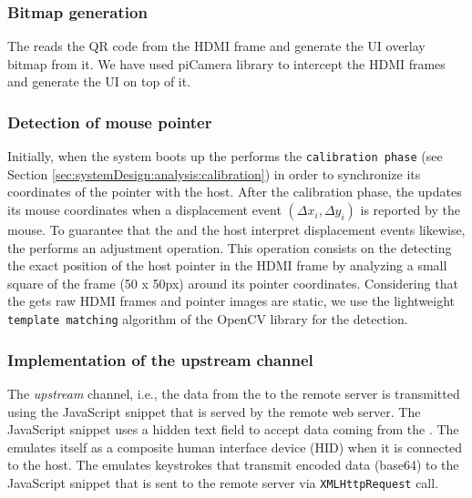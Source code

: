 \subsubsection{\bfseries Bitmap generation}

The \device reads the QR code from the HDMI frame and generate the UI overlay bitmap from it. We have used piCamera library to intercept the HDMI frames and generate the UI on top of it. 

\subsubsection{\bfseries Detection of mouse pointer}
Initially, when the system boots up the \device performs the \texttt{calibration phase} (see Section \ref{sec:systemDesign:analysis:calibration}) in order to synchronize its coordinates of the pointer with the host. After the calibration phase, the \device updates its mouse coordinates when a displacement event $(\Delta x_i, \Delta y_i)$ is reported by the mouse. To guarantee that the \device and the host interpret displacement events likewise, the \device performs an adjustment operation. This operation consists on the \device detecting the exact position of the host pointer in the HDMI frame by analyzing a small square of the frame (50 x 50px) around its pointer coordinates. Considering that the \device gets raw HDMI frames and pointer images are static, we use the lightweight \texttt{template matching} algorithm of the OpenCV library for the detection.

\subsubsection{\bfseries Implementation of the upstream channel}
\label{sec:prototype:impl:upstream}

 The \emph{upstream} channel, i.e., the data from the \device to the remote server is transmitted using the \name JavaScript snippet that is served by the remote web server. The \name JavaScript snippet uses a hidden text field to accept data coming from the \device. The \device emulates itself as a composite human interface device (HID) when it is connected to the host. The \device emulates keystrokes that transmit encoded data (base64) to the \name JavaScript snippet that is sent to the remote server via \texttt{XMLHttpRequest} call.





